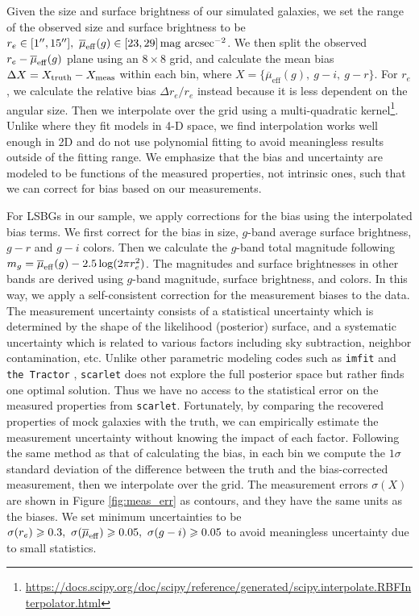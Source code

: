 \documentclass[twocolumn,astrosymb,twocolappendix]{aastex631}
\newcommand{\sbunit}{\mathrm{mag\ arcsec}^{-2}}
\newcommand{\sbeff}{\overline{\mu}_{\mathrm{eff}}(g)}
\newcommand{\code}[1]{\texttt{#1}}
\begin{document}
\begin{CJK*}{UTF8}{gbsn}
Given the size and surface brightness of our simulated galaxies, we set the range of the observed size and surface brightness to be $r_e\in[1\arcsec, 15\arcsec],\ \sbeff\in[23, 29]\,\sbunit$. We then split the observed $r_e-\overline{\mu}_{\rm eff}(g)$ plane using an $8\times 8$ grid, and calculate the mean bias $\Delta X = X_{\rm truth} - X_{\rm meas}$ within each bin, where $X=\{\sbeff,\ g-i,\ g-r\}$. For $r_e$, we calculate the relative bias $\Delta r_e / r_e$ instead because it is less dependent on the angular size. Then we interpolate over the grid using a multi-quadratic kernel\footnote{\url{https://docs.scipy.org/doc/scipy/reference/generated/scipy.interpolate.RBFInterpolator.html}}. Unlike \citet{Zaritsky2021} where they fit models in 4-D space, we find interpolation works well enough in 2D and do not use polynomial fitting to avoid meaningless results outside of the fitting range. We emphasize that the bias and uncertainty are modeled to be functions of the measured properties, not intrinsic ones, such that we can correct for bias based on our measurements. 

For LSBGs in our sample, we apply corrections for the bias using the interpolated bias terms. We first correct for the bias in size, $g$-band average surface brightness, $g-r$ and $g-i$ colors. Then we calculate the $g$-band total magnitude following $m_g = \overline{\mu}_{\rm eff}(g) - 2.5\log(2\pi r_e^2)$. The magnitudes and surface brightnesses in other bands are derived using $g$-band magnitude, surface brightness, and colors. In this way, we apply a self-consistent correction for the measurement biases to the data. 
The measurement uncertainty consists of a statistical uncertainty which is determined by the shape of the likelihood (posterior) surface, and a systematic uncertainty which is related to various factors including sky subtraction, neighbor contamination, etc. Unlike other parametric modeling codes such as \code{imfit} \citep{imfit} and \code{the Tractor} \citep{Lang2016}, \code{scarlet} does not explore the full posterior space but rather finds one optimal solution. Thus we have no access to the statistical error on the measured properties from \code{scarlet}. Fortunately, by comparing the recovered properties of mock galaxies with the truth, we can empirically estimate the measurement uncertainty without knowing the impact of each factor. Following the same method as that of calculating the bias, in each bin we compute the $1\sigma$ standard deviation of the difference between the truth and the bias-corrected measurement, then we interpolate over the grid. The measurement errors $\sigma(X)$ are shown in Figure \ref{fig:meas_err} as contours, and they have the same units as the biases. We set minimum uncertainties to be $\sigma(r_e) \geqslant 0.3,\ \sigma(\overline{\mu}_{\rm eff}) \geqslant 0.05,\ \sigma(g-i) \geqslant 0.05$ to avoid meaningless uncertainty due to small statistics.



\end{CJK*}
\end{document}
